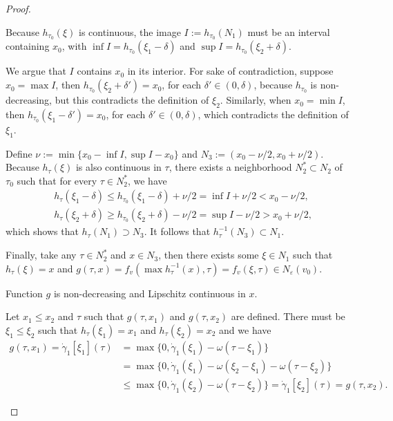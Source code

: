 \documentclass[a4paper]{article}
\theoremstyle{definition}
\theoremstyle{plain}
\begin{document}
\begin{proof}
\begin{outline}
  \2 Because $h_{\tau_{0}}(\xi)$ is continuous, the image $I := h_{\tau_{0}}(N_{1})$
  must be an interval containing $x_{0}$, with
  $\inf I = h_{\tau_{0}}(\xi_{1} - \delta)$ and
  $\sup I = h_{\tau_{0}}(\xi_{2} + \delta)$.

  \2 We argue that $I$ contains $x_{0}$ in its interior. For sake of
  contradiction, suppose $x_{0} = \max I$, then $h_{\tau_{0}}(\xi_{2} + \delta') = x_{0}$,
  for each $\delta' \in (0, \delta)$, because $h_{\tau_{0}}$ is non-decreasing, but this
  contradicts the definition of $\xi_{2}$. Similarly, when $x_{0} = \min I$, then
  $h_{\tau_{0}}(\xi_{1} - \delta') = x_{0}$, for each $\delta' \in (0, \delta)$, which contradicts the
  definition of $\xi_{1}$.

  \2 Define $\nu := \min \{ x_{0} - \inf I, \sup I - x_{0}\}$ and
  $N_{3} := (x_{0} - \nu / 2, x_{0} + \nu / 2)$. Because $h_{\tau}(\xi)$ is also
  continuous in $\tau$, there exists a neighborhood $N_{2}^{*} \subset N_{2}$ of
  $\tau_{0}$ such that for every $\tau \in N_{2}^{*}$, we have
  \begin{align*}
  &h_{\tau}(\xi_{1} - \delta) \leq h_{\tau_{0}}(\xi_{1} - \delta) + \nu/2 = \inf I + \nu /2 < x_{0} - \nu/2 , \\
  &h_{\tau}(\xi_{2} + \delta) \geq h_{\tau_{0}}(\xi_{2} + \delta) - \nu/2 = \sup I - \nu /2 > x_{0} + \nu/2 ,
  \end{align*}
  which shows that $h_{\tau}(N_{1}) \supset N_{3}$. It follows that
  $h_{\tau}^{-1}(N_{3}) \subset N_{1}$.

  \2 Finally, take any $\tau \in N_{2}^{*}$ and $x \in N_{3}$, then there exists
  some $\xi \in N_{1}$ such that $h_{\tau}(\xi) = x$ and
  $g(\tau, x) = f_{v}(\max h_{\tau}^{-1}(x), \tau) = f_{v}(\xi, \tau) \in N_{\varepsilon}(v_{0})$.

  \1 Function $g$ is non-decreasing and Lipschitz continuous in $x$.

  \2 Let $x_{1} \leq x_{2}$ and $\tau$ such that $g(\tau, x_{1})$ and
  $g(\tau, x_{2})$ are defined. There must be $\xi_{1} \leq \xi_{2}$ such that
  $h_{\tau}(\xi_{1}) = x_{1}$ and $h_{\tau}(\xi_{2}) = x_{2}$ and we have
  \begin{align*}
    g(\tau, x_{1}) = \dot{\gamma}_{1}[\xi_{1}](\tau)
    &= \max\{0, \dot{\gamma}_{1}(\xi_{1}) - \omega(\tau - \xi_{1}) \} \\
    &= \max\{0, \dot{\gamma}_{1}(\xi_{1}) - \omega(\xi_{2} - \xi_{1}) - \omega(\tau - \xi_{2}) \} \\
    &\leq \max\{0, \dot{\gamma}_{1}(\xi_{2}) - \omega(\tau - \xi_{2}) \}
    = \dot{\gamma}_{1}[\xi_{2}](\tau) = g(\tau, x_{2}) .
  \end{align*}


\end{outline}
\end{proof}
\end{document}
